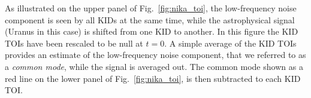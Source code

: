 %

As illustrated on the upper panel of Fig.~\ref{fig:nika_toi}, the
low-frequency noise component is seen by all KIDs at the same time,
while the astrophysical signal {\lp (Uranus in this case)} is shifted
from one KID to another.
{\lp In this figure the KID TOIs have been rescaled to be null
at $t=0$.} 
A simple average of the KID TOIs provides an
estimate of the low-frequency noise component, that we referred to as
a \emph{common mode}, while the signal is averaged out. The common
mode shown as a red line on the lower panel of
Fig.~\ref{fig:nika_toi}, is then subtracted to each KID TOI.


